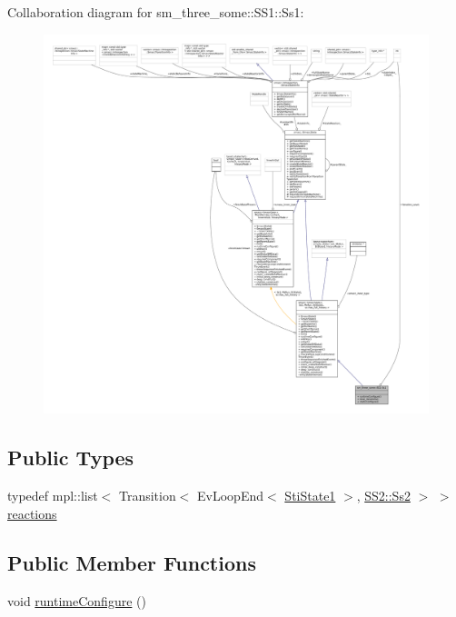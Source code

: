 Collaboration diagram for sm\+\_\+three\+\_\+some\+:\+:S\+S1\+:\+:Ss1\+:
\nopagebreak
\begin{figure}[H]
\begin{center}
\leavevmode
\includegraphics[width=350pt]{structsm__three__some_1_1SS1_1_1Ss1__coll__graph}
\end{center}
\end{figure}
\subsection*{Public Types}
\begin{DoxyCompactItemize}
\item 
typedef mpl\+::list$<$ Transition$<$ Ev\+Loop\+End$<$ \hyperlink{structsm__three__some_1_1inner__states_1_1StiState1}{Sti\+State1} $>$, \hyperlink{structsm__three__some_1_1SS2_1_1Ss2}{S\+S2\+::\+Ss2} $>$ $>$ \hyperlink{structsm__three__some_1_1SS1_1_1Ss1_af609dca860303e5a4b4913bed8b71bed}{reactions}
\end{DoxyCompactItemize}
\subsection*{Public Member Functions}
\begin{DoxyCompactItemize}
\item 
void \hyperlink{structsm__three__some_1_1SS1_1_1Ss1_ab19a0f3d403cad31a8b726e8eec366a2}{runtime\+Configure} ()
\end{DoxyCompactItemize}
